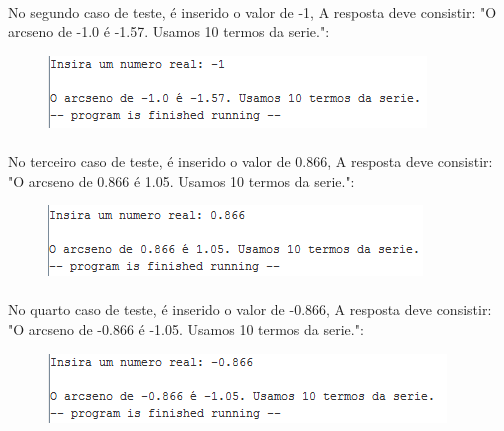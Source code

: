 \documentclass[a4paper, 12pt]{article}
\begin{document}
        \paragraph{}    No segundo caso de teste, \'e inserido o valor de -1, A resposta deve consistir: "O arcseno de -1.0 \'e -1.57. Usamos 10 termos da serie.":
        \begin{figure}[H]
        	\centering
        	\includegraphics[scale=0.5]{img6.png}
		\end{figure}
		\paragraph{}     No terceiro caso de teste, \'e inserido o valor de 0.866, A resposta deve consistir: "O arcseno de 0.866 \'e 1.05. Usamos 10 termos da serie.":
        \begin{figure}[H]
        	\centering
        	\includegraphics[scale=0.5]{img7.png}
        \end{figure}
        \paragraph{}    No quarto caso de teste, \'e inserido o valor de -0.866, A resposta deve consistir: "O arcseno de -0.866 \'e -1.05. Usamos 10 termos da serie.":
        \begin{figure}[H]
        	\centering
        	\includegraphics[scale=0.5]{img8.png}
		\end{figure}
		
        \paragraph{}    
\end{document}
